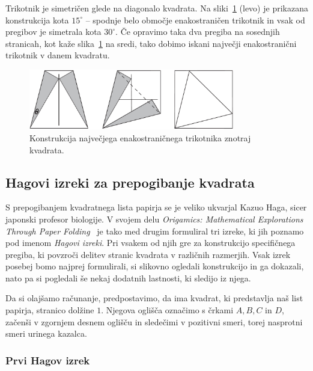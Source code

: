 Trikotnik je simetričen glede na diagonalo kvadrata. Na sliki~\ref{fig:trik_enak_max2} (levo) je prikazana konstrukcija kota $15^\circ$ -- spodnje belo območje enakostraničen trikotnik in vsak od pregibov je simetrala kota $30^\circ$. Če opravimo taka dva pregiba na sosednjih stranicah, kot kaže slika~\ref{fig:trik_enak_max2} na sredi, tako dobimo iskani največji enakostranični trikotnik v danem kvadratu.

\begin{figure}[h]
    \centering
    \includegraphics[width=0.8\textwidth]{images/n-kotniki/trik_enak_max2.png}
    \caption[Konstrukcija največjega enakostraničnega trikotnika znotraj kvadrata]{Konstrukcija največjega enakostraničnega trikotnika znotraj kvadrata.}
    \label{fig:trik_enak_max2}
\end{figure}

\subsection{Hagovi izreki za prepogibanje kvadrata}

S prepogibanjem kvadratnega lista papirja se je veliko ukvarjal Kazuo Haga, sicer japonski profesor biologije. V svojem delu \emph{Origamics: Mathematical Explorations Through Paper Folding}~\cite{haga2008} je tako med drugim formuliral tri izreke, ki jih poznamo pod imenom \emph{Hagovi izreki}. Pri vsakem od njih gre za konstrukcijo specifičnega pregiba, ki povzroči delitev stranic kvadrata v različnih razmerjih. Vsak izrek posebej bomo najprej formulirali, si slikovno ogledali konstrukcijo in ga dokazali, nato pa si pogledali še nekaj dodatnih lastnosti, ki sledijo iz njega.

Da si olajšamo računanje, predpostavimo, da ima kvadrat, ki predstavlja naš list papirja, stranico dolžine $1$. Njegova oglišča označimo s črkami $A, B, C$ in $D$, začenši v zgornjem desnem oglišču in sledečimi v pozitivni smeri, torej nasprotni smeri urinega kazalca.

\subsubsection{Prvi Hagov izrek}

